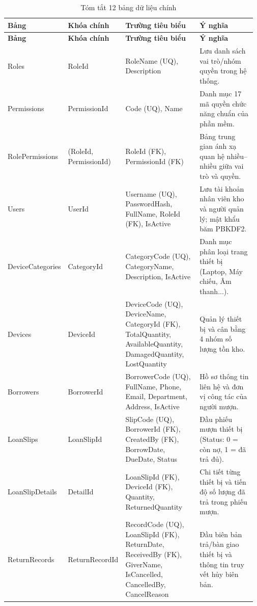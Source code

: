 {\small\setlength{\tabcolsep}{3pt}\renewcommand{\arraystretch}{1.25}
\begin{longtable}{|>{\raggedright\arraybackslash}p{0.114\linewidth}|>{\raggedright\arraybackslash}p{0.133\linewidth}|>{\raggedright\arraybackslash}p{0.361\linewidth}|>{\raggedright\arraybackslash}p{0.361\linewidth}|}
\caption{Tóm tắt 12 bảng dữ liệu chính}\\
\hline
\rowcolor{gray!25}\textbf{\textbf{Bảng}} & \textbf{\textbf{Khóa chính}} & \textbf{\textbf{Trường tiêu biểu}} & \textbf{\textbf{Ý nghĩa}} \\ \hline
\endfirsthead
\hline
\rowcolor{gray!25}\textbf{\textbf{Bảng}} & \textbf{\textbf{Khóa chính}} & \textbf{\textbf{Trường tiêu biểu}} & \textbf{\textbf{Ý nghĩa}} \\ \hline
\endhead
\hline\endfoot
Roles & RoleId & RoleName (UQ), Description & Lưu danh sách vai trò/nhóm quyền trong hệ thống. \\ \hline
Permissions & PermissionId & Code (UQ), Name & Danh mục 17 mã quyền chức năng chuẩn của phần mềm. \\ \hline
RolePermissions & (RoleId, PermissionId) & RoleId (FK), PermissionId (FK) & Bảng trung gian ánh xạ quan hệ nhiều–nhiều giữa vai trò và quyền. \\ \hline
Users & UserId & Username (UQ), PasswordHash, FullName, RoleId (FK), IsActive & Lưu tài khoản nhân viên kho và người quản lý; mật khẩu băm PBKDF2. \\ \hline
DeviceCategories & CategoryId & CategoryCode (UQ), CategoryName, Description, IsActive & Danh mục phân loại trang thiết bị (Laptop, Máy chiếu, Âm thanh...). \\ \hline
Devices & DeviceId & DeviceCode (UQ), DeviceName, CategoryId (FK), TotalQuantity, AvailableQuantity, DamagedQuantity, LostQuantity & Quản lý thiết bị và cân bằng 4 nhóm số lượng tồn kho. \\ \hline
Borrowers & BorrowerId & BorrowerCode (UQ), FullName, Phone, Email, Department, Address, IsActive & Hồ sơ thông tin liên hệ và đơn vị công tác của người mượn. \\ \hline
LoanSlips & LoanSlipId & SlipCode (UQ), BorrowerId (FK), CreatedBy (FK), BorrowDate, DueDate, Status & Đầu phiếu mượn thiết bị (Status: 0 = còn nợ, 1 = đã trả đủ). \\ \hline
LoanSlipDetails & DetailId & LoanSlipId (FK), DeviceId (FK), Quantity, ReturnedQuantity & Chi tiết từng thiết bị và tiến độ số lượng đã trả trong phiếu mượn. \\ \hline
ReturnRecords & ReturnRecordId & RecordCode (UQ), LoanSlipId (FK), ReturnDate, ReceivedBy (FK), GiverName, IsCancelled, CancelledBy, CancelReason & Đầu biên bản trả/bàn giao thiết bị và thông tin truy vết hủy biên bản. \\ \hline

\end{longtable}}
